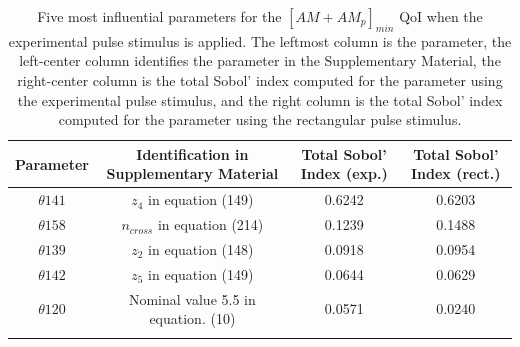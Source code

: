 \begin{table}[h]
\centering
{}
\begin{tabular}{cccc}
\toprule
Parameter & Identification in Supplementary Material & Total Sobol' Index (exp.) & Total Sobol' Index (rect.) \\
\midrule
$\theta{141}$ & $z_4$ in equation (149)  & 0.6242 & 0.6203\\
$\theta{158}$ & $n_{cross}$ in equation (214)  & 0.1239 & 0.1488\\
$\theta{139}$ &  $z_2$ in equation (148)  & 0.0918 & 0.0954\\
$\theta{142}$ & $z_5$ in equation (149)  &0.0644 & 0.0629\\
$\theta{120}$ & Nominal value 5.5 in equation. (10)  & 0.0571 & 0.0240\\
 \arrayrulecolor{black}\bottomrule
\end{tabular}
\caption{Five most influential parameters for the $[AM+AM_p]_{min}$ QoI when the experimental pulse stimulus is applied. The leftmost column is the parameter, the left-center column identifies the parameter in the Supplementary Material, the right-center column is the total Sobol' index computed for the parameter using the experimental pulse stimulus, and the right column is the total Sobol' index computed for the parameter using the rectangular pulse stimulus.}
\label{tab:qoi_AM_AMp_Min}
\end{table}

%
%
%
